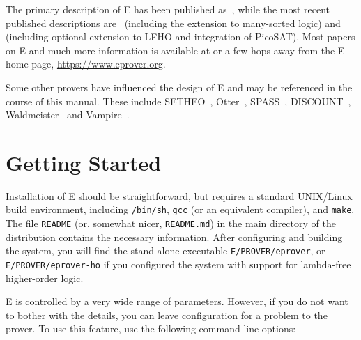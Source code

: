 \documentclass{report}
\begin{document}
The primary description of E has been published
as~\cite{Schulz:AICOM-2002}, while the most recent published
descriptions are~\cite{Schulz:LPAR-2013} (including the extension to
many-sorted logic) and~\cite{SCV:CADE-2019} (including optional
extension to LFHO and integration of PicoSAT). Most papers on E and
much more information is available at or a few hops away from the E
home page, \url{https://www.eprover.org}.

Some other provers have influenced the design of E and may be
referenced in the course of this manual. These include
SETHEO~\cite{MILSGSM:JAR-97},
Otter~\cite{Mc94,MW:JAR-97},
SPASS~\cite{WGR96,WABCEKTT:CADE-99},
DISCOUNT~\cite{DKS97}, Waldmeister~\cite{BHF96,HJL:CADE-99} and
Vampire~\cite{RV:AICOM-2002,RV:IJCAR-2001,KV:CAV-2013}.


\chapter{Getting Started}
\label{sec:start}

Installation of E should be straightforward, but requires a standard
UNIX/Linux build environment, including \texttt{/bin/sh}, \texttt{gcc}
(or an equivalent compiler), and \texttt{make}. The file
\texttt{README} (or, somewhat nicer, \texttt{README.md}) in the main
directory of the distribution contains the necessary
information. After configuring and building the system, you will find
the stand-alone executable \texttt{E/PROVER/eprover}, or
\texttt{E/PROVER/eprover-ho} if you configured the system with support
for lambda-free higher-order logic.

E is controlled by a very wide range of parameters. However, if you do
not want to bother with the details, you can leave configuration for a
problem to the prover. To use this feature, use the following command
line options:
\end{document}
